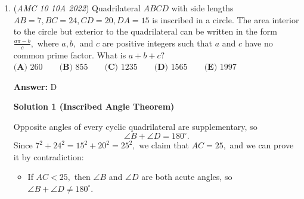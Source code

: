 \begin{enumerate}
\textbf{Solution 3 (Generalization)}

The integers $x \in \{8, \ldots , 14 \}$ must each be the larger elements of a distinct pair.

 Assign partners in decreasing order for $x \in \{7, \dots, 1\}$:

 Note that $7$ must pair with $14$: $\mathbf{1} \textbf{ choice}$.

 For $5 \leq x \leq 7$, the choices are $\{2x, \dots, 14\} - \{ \text{previous choices}\}$. As $x$ decreases by 1, The minuend increases by 2 elements, and the subtrahend increases by 1 element, so the difference increases by 1, yielding $\mathbf{3!} \textbf{ combined choices}$.

 After assigning a partner to $5$, there are no invalid pairings for yet-unpaired numbers, so there are $\mathbf{4!} \textbf{ ways}$ to choose partners for $\{1,2,3,4\}$.

 The answer is $3! \cdot 4! = \boxed{\textbf{(E) } 144}$.

 In general, for $1,\ldots,2n$, the same logic yields answer: $\left\lfloor\dfrac{n}{2}\right\rfloor! \cdot \left\lceil\dfrac{n}{2}\right\rceil!$



	\item (\textit{AMC 10 10A 2022}) Quadrilateral $ABCD$ with side lengths $AB=7, BC=24, CD=20, DA=15$ is inscribed in a circle. The area interior to the circle but exterior to the quadrilateral can be written in the form $\frac{a\pi-b}{c},$ where $a,b,$ and $c$ are positive integers such that $a$ and $c$ have no common prime factor. What is $a+b+c?$
$\textbf{(A) } 260 \qquad \textbf{(B) } 855 \qquad \textbf{(C) } 1235 \qquad \textbf{(D) } 1565 \qquad \textbf{(E) } 1997$

 \textbf{Answer: }D



\textbf{Solution 1 (Inscribed Angle Theorem)}

Opposite angles of every cyclic quadrilateral are supplementary, so 
 \[\angle B + \angle D = 180^{\circ}.\] Since $7^2+24^2=15^2+20^2=25^2,$ we claim that $AC=25,$ and we can prove it by contradiction:

 
            \begin{itemize}
        \item If $AC<25,$ then $\angle B$ and $\angle D$ are both acute angles, so $\angle B + \angle D \neq 180^{\circ}.$
            \end{itemize}
            

\end{enumerate}
